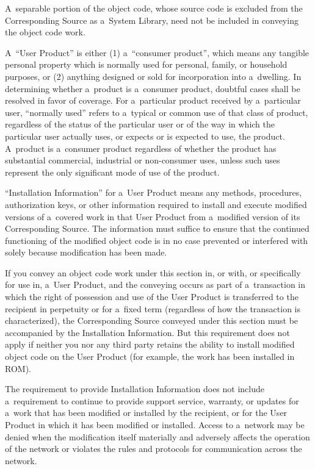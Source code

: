 \documentclass[a4paper, 11pt, twoside]{article}
\begin{document}
A~separable portion of the object code, whose source code is excluded from the Corresponding Source as a~System Library, need not be included in conveying the object code work.

A~“User Product” is either (1) a~“consumer product”, which means any tangible personal property which is normally used for personal, family, or household purposes, or (2) anything designed or sold for incorporation into a~dwelling. In determining whether a~product is a~consumer product, doubtful cases shall be resolved in favor of coverage. For a~particular product received by a~particular user, “normally used” refers to a~typical or common use of that class of product, regardless of the status of the particular user or of the way in which the particular user actually uses, or expects or is expected to use, the product. A~product is a~consumer product regardless of whether the product has substantial commercial, industrial or non-consumer uses, unless such uses represent the only significant mode of use of the product.

“Installation Information” for a~User Product means any methods, procedures, authorization keys, or other information required to install and execute modified versions of a~covered work in that User Product from a~modified version of its Corresponding Source. The information must suffice to ensure that the continued functioning of the modified object code is in no case prevented or interfered with solely because modification has been made.

If you convey an object code work under this section in, or with, or specifically for use in, a~User Product, and the conveying occurs as part of a~transaction in which the right of possession and use of the User Product is transferred to the recipient in perpetuity or for a~fixed term (regardless of how the transaction is characterized), the Corresponding Source conveyed under this section must be accompanied by the Installation Information. But this requirement does not apply if neither you nor any third party retains the ability to install modified object code on the User Product (for example, the work has been installed in ROM).

The requirement to provide Installation Information does not include a~requirement to continue to provide support service, warranty, or updates for a~work that has been modified or installed by the recipient, or for the User Product in which it has been modified or installed. Access to a~network may be denied when the modification itself materially and adversely affects the operation of the network or violates the rules and protocols for communication across the network.
\end{document}
